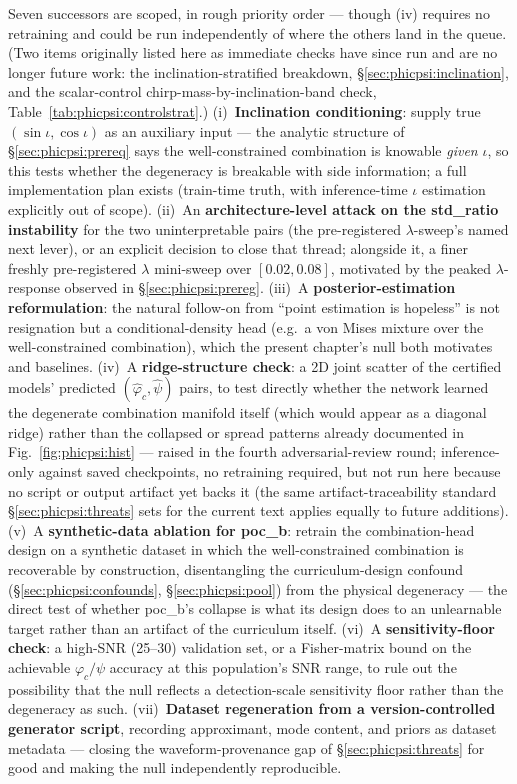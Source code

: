 Seven successors are scoped, in rough priority order --- though (iv) requires no retraining and could be run independently of where the others land in the queue.
(Two items originally listed here as immediate checks have since run and are no longer future work: the inclination-stratified breakdown, \S\ref{sec:phicpsi:inclination}, and the scalar-control chirp-mass-by-inclination-band check, Table~\ref{tab:phicpsi:controlstrat}.)
(i)~\textbf{Inclination conditioning}: supply true $(\sin\iota, \cos\iota)$ as an auxiliary input --- the analytic structure of \S\ref{sec:phicpsi:prereq} says the well-constrained combination is knowable \emph{given} $\iota$, so this tests whether the degeneracy is breakable with side information; a full implementation plan exists (train-time truth, with inference-time $\iota$ estimation explicitly out of scope).
(ii)~An \textbf{architecture-level attack on the std\_ratio instability} for the two uninterpretable pairs (the pre-registered $\lambda$-sweep's named next lever), or an explicit decision to close that thread; alongside it, a finer freshly pre-registered $\lambda$ mini-sweep over $[0.02, 0.08]$, motivated by the peaked $\lambda$-response observed in \S\ref{sec:phicpsi:prereg}.
(iii)~A \textbf{posterior-estimation reformulation}: the natural follow-on from ``point estimation is hopeless'' is not resignation but a conditional-density head (e.g.\ a von Mises mixture over the well-constrained combination), which the present chapter's null both motivates and baselines.
(iv)~A \textbf{ridge-structure check}: a 2D joint scatter of the certified models' predicted $(\hat\varphi_c, \hat\psi)$ pairs, to test directly whether the network learned the degenerate combination manifold itself (which would appear as a diagonal ridge) rather than the collapsed or spread patterns already documented in Fig.~\ref{fig:phicpsi:hist} --- raised in the fourth adversarial-review round; inference-only against saved checkpoints, no retraining required, but not run here because no script or output artifact yet backs it (the same artifact-traceability standard \S\ref{sec:phicpsi:threats} sets for the current text applies equally to future additions).
(v)~A \textbf{synthetic-data ablation for poc\_b}: retrain the combination-head design on a synthetic dataset in which the well-constrained combination is recoverable by construction, disentangling the curriculum-design confound (\S\ref{sec:phicpsi:confounds}, \S\ref{sec:phicpsi:pool}) from the physical degeneracy --- the direct test of whether poc\_b's collapse is what its design does to an unlearnable target rather than an artifact of the curriculum itself.
(vi)~A \textbf{sensitivity-floor check}: a high-SNR (25--30) validation set, or a Fisher-matrix bound on the achievable $\varphi_c/\psi$ accuracy at this population's SNR range, to rule out the possibility that the null reflects a detection-scale sensitivity floor rather than the degeneracy as such.
(vii)~\textbf{Dataset regeneration from a version-controlled generator script}, recording approximant, mode content, and priors as dataset metadata --- closing the waveform-provenance gap of \S\ref{sec:phicpsi:threats} for good and making the null independently reproducible.


